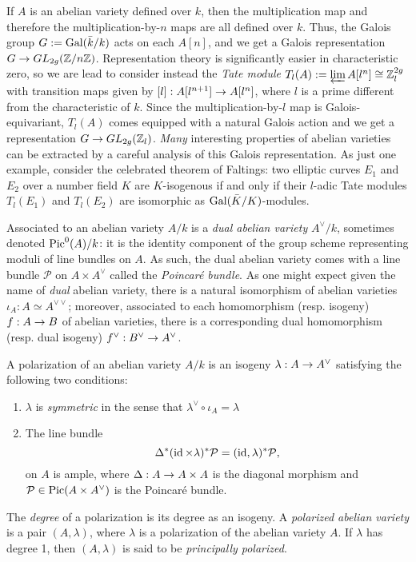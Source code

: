 If $A$ is an abelian variety defined over $k$, then the multiplication map and therefore the multiplication-by-$n$ maps are all defined over $k$. Thus, the Galois group $G:=\operatorname{Gal}(\bar{k}/k)$ acts on each $A[n]$, and we get a Galois representation $G\rightarrow GL_{2g}(\mathbb{Z}/n\mathbb{Z})$. Representation theory is significantly easier in characteristic zero, so we are lead to consider instead the \emph{Tate module} $T_l(A):=\varprojlim A[l^n]\cong \mathbb{Z}_l^{2g}$ with transition maps given by $[l]:A[l^{n+1}]\rightarrow A[l^n]$, where $l$ is a prime different from the characteristic of $k$. Since the multiplication-by-$l$ map is Galois-equivariant, $T_l(A)$ comes equipped with a natural Galois action and we get a representation $G\rightarrow GL_{2g}(\mathbb{Z}_l)$.  \emph{Many} interesting properties of abelian varieties can be extracted by a careful analysis of this Galois representation. As just one example, consider the celebrated theorem of Faltings: two elliptic curves $E_1$ and $E_2$ over a number field $K$ are $K$-isogenous if and only if their $l$-adic Tate modules $T_l(E_1)$ and $T_l(E_2)$ are isomorphic as $\operatorname{Gal}(\bar{K}/K)$-modules.

Associated to an abelian variety $A/k$ is a \emph{dual abelian variety} $A^{\vee}/k$, sometimes denoted $\operatorname{Pic}^0(A)/k$: it is the identity component of the group scheme representing moduli of line bundles on $A$. As such, the dual abelian variety comes with a line bundle $\mathcal{P}$ on $A\times A^{\vee}$ called the \emph{Poincar\'e bundle}. As one might expect given the name of \emph{dual} abelian variety, there is a natural isomorphism of abelian varieties $\iota_A:A\simeq A^{\vee\vee}$; moreover, associated to each homomorphism (resp. isogeny) $f:A\rightarrow B$ of abelian varieties, there is a corresponding dual homomorphism (resp. dual isogeny) $f^{\vee}:B^{\vee}\rightarrow A^{\vee}$.

\begin{definition}
A polarization of an abelian variety $A/k$ is an isogeny $\lambda:A\rightarrow A^{\vee}$ satisfying the following two conditions:
\begin{enumerate}
	\item $\lambda$ is \emph{symmetric} in the sense that $\lambda^{\vee}\circ \iota_A = \lambda$
	\item The line bundle $$\Delta^*(\operatorname{id}\times \lambda)^*\mathcal{P}=(\operatorname{id},\lambda)^*\mathcal{P},$$
	on $A$ is ample, where $\Delta:A\rightarrow A\times A$ is the diagonal morphism and $\mathcal{P}\in\operatorname{Pic}(A\times A^{\vee})$ is the Poincar\'e bundle.
\end{enumerate} 
The \emph{degree} of a polarization is its degree as an isogeny. A \emph{polarized abelian variety} is a pair $(A,\lambda)$, where $\lambda$ is a polarization of the abelian variety $A$. If $\lambda$ has degree 1, then $(A,\lambda)$ is said to be \emph{principally polarized}.
\end{definition}

